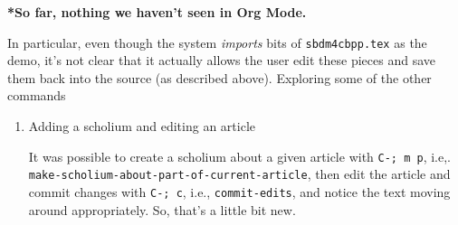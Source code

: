 \documentclass[11pt]{article}
\begin{document}
\begin{enumerate}
\textbf{*So far, nothing we haven’t seen in Org Mode.}

In particular, even though the system \emph{imports} bits of \texttt{sbdm4cbpp.tex} as
the demo, it’s not clear that it actually allows the user edit these
pieces and save them back into the source (as described above).
Exploring some of the other commands

\begin{enumerate}
\item Adding a scholium and editing an article
\label{sec:org7e27afe}

It was possible to create a scholium about a given article with \texttt{C-; m
p}, i.e,. \texttt{make-scholium-about-part-of-current-article}, then edit the
article and commit changes with \texttt{C-; c}, i.e., \texttt{commit-edits}, and notice
the text moving around appropriately.  So, that’s a little bit new.
\end{enumerate}
\end{enumerate}
\end{document}
